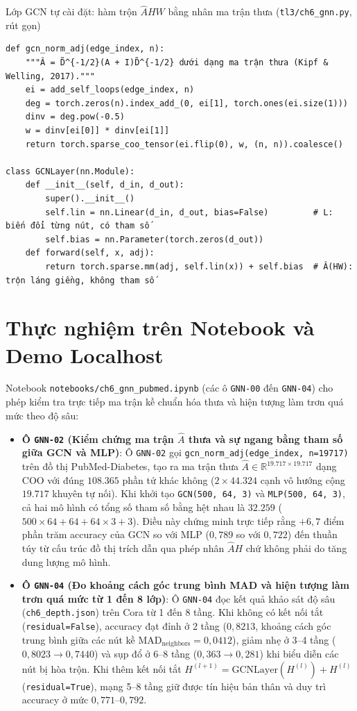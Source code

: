 \begin{code}{Lớp GCN tự cài đặt: hàm trộn $\hat A H W$ bằng nhân ma trận thưa (\texttt{tl3/ch6\_gnn.py}, rút gọn)}
\label{lst:ch6-gcn}
\begin{verbatim}
def gcn_norm_adj(edge_index, n):
    """Â = D̃^{-1/2}(A + I)D̃^{-1/2} dưới dạng ma trận thưa (Kipf & Welling, 2017)."""
    ei = add_self_loops(edge_index, n)
    deg = torch.zeros(n).index_add_(0, ei[1], torch.ones(ei.size(1)))
    dinv = deg.pow(-0.5)
    w = dinv[ei[0]] * dinv[ei[1]]
    return torch.sparse_coo_tensor(ei.flip(0), w, (n, n)).coalesce()

class GCNLayer(nn.Module):
    def __init__(self, d_in, d_out):
        super().__init__()
        self.lin = nn.Linear(d_in, d_out, bias=False)         # L: biến đổi từng nút, có tham số
        self.bias = nn.Parameter(torch.zeros(d_out))
    def forward(self, x, adj):
        return torch.sparse.mm(adj, self.lin(x)) + self.bias  # Â(HW): trộn láng giềng, không tham số
\end{verbatim}
\end{code}

\section{Thực nghiệm trên Notebook và Demo Localhost}
\label{sec:ch6-notebook-demo}

Notebook \texttt{notebooks/ch6\_gnn\_pubmed.ipynb} (các ô \texttt{GNN-00} đến \texttt{GNN-04}) cho phép kiểm tra trực tiếp ma trận kề chuẩn hóa thưa và hiện tượng làm trơn quá mức theo độ sâu:
\begin{itemize}
  \item \textbf{Ô \texttt{GNN-02} (Kiểm chứng ma trận $\hat A$ thưa và sự ngang bằng tham số giữa GCN và MLP)}: Ô \texttt{GNN-02} gọi \texttt{gcn\_norm\_adj(edge\_index, n=19717)} trên đồ thị PubMed-Diabetes, tạo ra ma trận thưa $\hat A\in\mathbb R^{19.717\times 19.717}$ dạng COO với đúng $108.365$ phần tử khác không ($2\times 44.324$ cạnh vô hướng cộng $19.717$ khuyên tự nối). Khi khởi tạo \texttt{GCN(500, 64, 3)} và \texttt{MLP(500, 64, 3)}, cả hai mô hình có tổng số tham số bằng hệt nhau là $32.259$ ($500\times 64 + 64 + 64\times 3 + 3$). Điều này chứng minh trực tiếp rằng $+6{,}7$ điểm phần trăm accuracy của GCN so với MLP ($0{,}789$ so với $0{,}722$) đến thuần túy từ cấu trúc đồ thị trích dẫn qua phép nhân $\hat A H$ chứ không phải do tăng dung lượng mô hình.
  \item \textbf{Ô \texttt{GNN-04} (Đo khoảng cách góc trung bình MAD và hiện tượng làm trơn quá mức từ 1 đến 8 lớp)}: Ô \texttt{GNN-04} đọc kết quả khảo sát độ sâu (\texttt{ch6\_depth.json}) trên Cora từ 1 đến 8 tầng. Khi không có kết nối tắt (\texttt{residual=False}), accuracy đạt đỉnh ở 2 tầng ($0{,}8213$, khoảng cách góc trung bình giữa các nút kề $\text{MAD}_{\text{neighbors}}=0{,}0412$), giảm nhẹ ở 3–4 tầng ($0{,}8023\to 0{,}7440$) và sụp đổ ở 6–8 tầng ($0{,}363\to 0{,}281$) khi biểu diễn các nút bị hòa trộn. Khi thêm kết nối tắt $H^{(l+1)} = \text{GCNLayer}(H^{(l)}) + H^{(l)}$ (\texttt{residual=True}), mạng 5–8 tầng giữ được tín hiệu bản thân và duy trì accuracy ở mức $0{,}771–0{,}792$.
\end{itemize}

